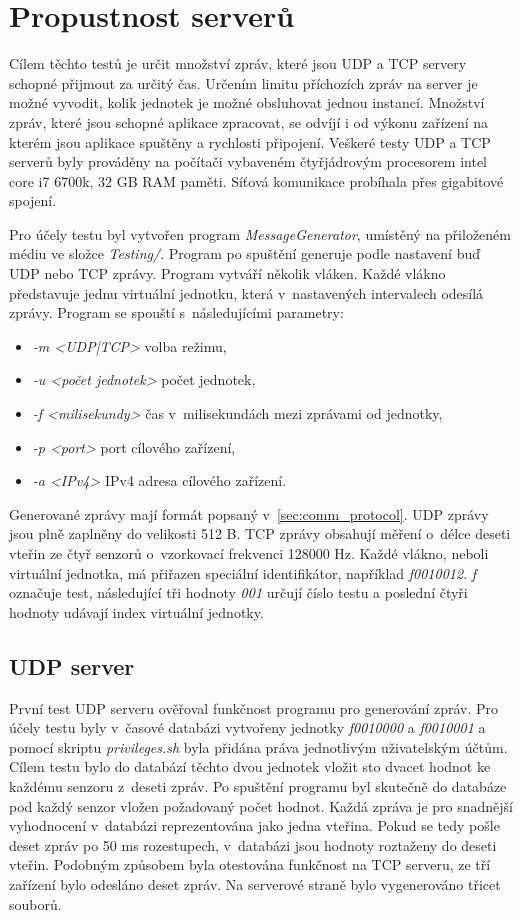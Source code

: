 \section{Propustnost serverů}
Cílem těchto testů je určit množství zpráv, které jsou UDP a TCP servery schopné přijmout za určitý čas. Určením limitu příchozích zpráv na server je možné vyvodit, kolik jednotek je možné obsluhovat jednou instancí. Množství zpráv, které jsou schopné aplikace zpracovat, se odvíjí i od výkonu zařízení na kterém jsou aplikace spuštěny a rychlosti připojení. Veškeré testy UDP a TCP serverů byly prováděny na počítači vybaveném čtyřjádrovým procesorem intel core i7 6700k, 32 GB RAM paměti. Síťová komunikace probíhala přes gigabitové spojení.

Pro účely testu byl vytvořen program \textit{MessageGenerator}, umístěný na přiloženém médiu ve složce \textit{Testing/}. Program po spuštění generuje podle nastavení buď UDP nebo TCP zprávy. Program vytváří několik vláken. Každé vlákno představuje jednu virtuální jednotku, která v~nastavených intervalech odesílá zprávy. Program se spouští s~následujícími parametry:
\begin{itemize}
    \item \textit{-m <UDP|TCP>} volba režimu,
    \item \textit{-u <počet jednotek>} počet jednotek,
    \item \textit{-f <milisekundy>} čas v~milisekundách mezi zprávami od jednotky,
    \item \textit{-p <port>} port cílového zařízení,
    \item \textit{-a <IPv4>} IPv4 adresa cílového zařízení.
\end{itemize}
Generované zprávy mají formát popsaný v~\ref{sec:comm_protocol}. UDP zprávy jsou plně zaplněny do velikosti 512 B. TCP zprávy obsahují měření o~délce deseti vteřin ze čtyř senzorů o~vzorkovací frekvenci 128000 Hz. Každé vlákno, neboli virtuální jednotka, má přiřazen speciální identifikátor, například \textit{f0010012}. \textit{f} označuje test, následující tři hodnoty \textit{001} určují číslo testu a poslední čtyři hodnoty udávají index virtuální jednotky. 

\subsection{UDP server}
První test UDP serveru ověřoval funkčnost programu pro generování zpráv. Pro účely testu byly v~časové databázi vytvořeny jednotky \textit{f0010000} a \textit{f0010001} a pomocí skriptu \textit{privileges.sh} byla přidána práva jednotlivým uživatelským účtům. Cílem testu bylo do databází těchto dvou jednotek vložit sto dvacet hodnot ke každému senzoru z~deseti zpráv. Po spuštění programu byl skutečně do databáze pod každý senzor vložen požadovaný počet hodnot. Každá zpráva je pro snadnější vyhodnocení v~databázi reprezentována jako jedna vteřina. Pokud se tedy pošle deset zpráv po 50 ms rozestupech, v~databázi jsou hodnoty roztaženy do deseti vteřin. Podobným způsobem byla otestována funkčnost na TCP serveru, ze tří zařízení bylo odesláno deset zpráv. Na serverové straně bylo vygenerováno třicet souborů. 

